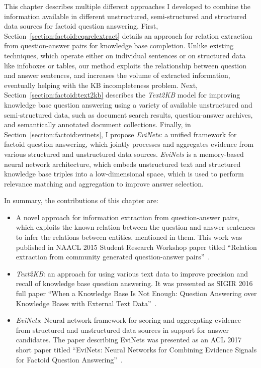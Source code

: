 This chapter describes multiple different approaches I developed to combine the information available in different unstructured, semi-structured and structured data sources for factoid question answering.
First, Section~\ref{section:factoid:cqarelextract} details an approach for relation extraction from question-answer pairs for knowledge base completion.
Unlike existing techniques, which operate either on individual sentences or on structured data like infoboxes or tables, our method exploits the relationship between question and answer sentences, and increases the volume of extracted information, eventually helping with the KB incompleteness problem.
Next, Section~\ref{section:factoid:text2kb} describes the \textit{Text2KB} model for improving knowledge base question answering using a variety of available unstructured and semi-structured data, such as document search results, question-answer archives, and semantically annotated document collections.
Finally, in Section~\ref{section:factoid:evinets}, I propose \textit{EviNets}: a unified framework for factoid question answering, which jointly processes and aggregates evidence from various structured and unstructured data sources.
\textit{EviNets} is a memory-based neural network architecture, which embeds unstructured text and structured knowledge base triples into a low-dimensional space, which is used to perform relevance matching and aggregation to improve answer selection.

In summary, the contributions of this chapter are:
\begin{itemize}
\item A novel approach for information extraction from question-answer pairs, which exploits the known relation between the question and answer sentences to infer the relations between entities, mentioned in them.
This work was published in NAACL 2015 Student Research Workshop paper titled ``Relation extraction from community generated question-answer pairs''~\cite{savenkov2015relation}.
\item \textit{Text2KB}: an approach for using various text data to improve precision and recall of knowledge base question answering.
It was presented as SIGIR 2016 full paper ``When a Knowledge Base Is Not Enough: Question Answering over Knowledge Bases with External Text Data''~\cite{Savenkov:2016:KBE:2911451.2911536}.
\item \textit{EviNets}: Neural network framework for scoring and aggregating evidence from structured and unstructured data sources in support for answer candidates.
The paper describing EviNets was presented as an ACL 2017 short paper titled ``EviNets: Neural Networks for Combining Evidence Signals for Factoid Question Answering''~\cite{savenkov_evinets17}.
\end{itemize}


